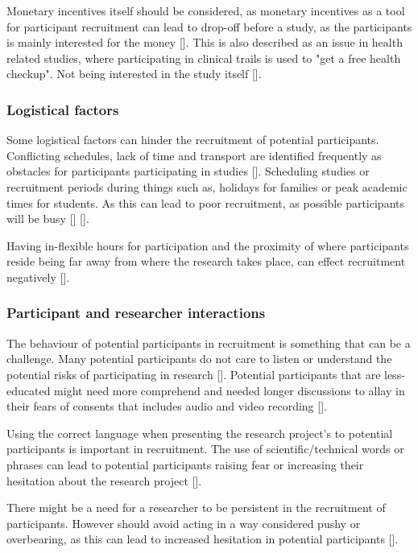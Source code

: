 Monetary incentives itself should be considered, as monetary incentives as a tool for participant recruitment can lead to drop-off before a study, as the participants is mainly interested for the money [\cite{pkf_2018}]. This is also described as an issue in health related studies, where participating in clinical trails is used to "get a free health checkup". Not being interested in the study itself [\cite{nc_2020}].

\subsubsection{Logistical factors}
Some logistical factors can hinder the recruitment of potential participants. Conflicting schedules, lack of time and transport are identified frequently as obstacles for participants participating in studies [\cite{pkf_2018}]. Scheduling studies or recruitment periods during things such as, holidays for families or peak academic times for students. As this can lead to poor recruitment, as possible participants will be busy [\cite{pkf_2018}] [\cite{nc_2020}]. 

Having in-flexible hours for participation and the proximity of where participants reside being far away from where the research takes place, can effect recruitment negatively [\cite{pkf_2018}].

\subsubsection{Participant and researcher interactions} \label{sec:participant-and-researcher-interactions}
The behaviour of potential participants in recruitment is something that can be a challenge. Many potential participants do not care to listen or understand the potential risks of participating in research [\cite{nc_2020}]. Potential participants that are less-educated might need more comprehend and needed longer discussions to allay in their fears of consents that includes audio and video recording [\cite{nc_2020}].

Using the correct language when presenting the research project's to potential participants is important in recruitment. The use of scientific/technical words or phrases can lead to potential participants raising fear or increasing their hesitation about the research project [\cite{pkf_2018}]. 

There might be a need for a researcher to be persistent in the recruitment of participants. However should avoid acting in a way considered pushy or overbearing, as this can lead to increased hesitation in potential participants [\cite{pkf_2018}].

